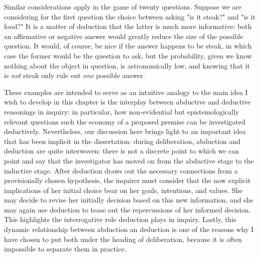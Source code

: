  Similar considerations apply in the game of twenty questions. Suppose we are considering for the first question the choice between asking "is it steak?" and "is it food?" It is a matter of deduction that the latter is much more informative: both an affirmative or negative answer would greatly reduce the size of the possible question. It would, of course, be nice if the answer happens to be steak, in which case the former would be the question to ask, but the probability, given we know nothing about the object in question, is astronomically low, and knowing that it is \emph{not} steak only rule out \emph{one} possible answer. 

These examples are intended to serve as an intuitive analogy to the main idea I wish to develop in this chapter is the interplay between abductive and deductive reasonings in inquiry: in particular, how non-evidential but epistemologically relevant questions such the economy of a proposed premise can be investigated deductively. Nevertheless, our discussion here brings light to an important idea that has been implicit in the dissertation: during deliberation, abduction and deduction are quite interwoven: there is not a discrete point to which we can point and say that the investigator has moved on from the abductive stage to the inductive stage. After deduction draws out the necessary connections from a provisionally chosen hypothesis, the inquirer must consider that the now explicit implications of her initial choice bear on her goals, intentions, and values. She may decide to revise her initially decision based on this new information, and she may again use deduction to tease out the repercussions of her informed decision. This highlights the interrogative role deduction plays in inquiry. Lastly, this dynamic relationship between abduction an deduction is one of the reasons why I have chosen to put both under the heading of deliberation, because it is often impossible to separate them in practice.      	
%
%




